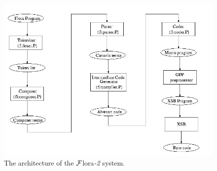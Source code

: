 \documentclass[11pt]{article}
\newcommand{\FLORA}{{\mbox{\sc ${\cal F}${lora}\rm\emph{-2}}}\xspace}
\begin{document}
\begin{figure}[bt]
  \begin{center}
    \includegraphics[width=5.5in]{architecture}
  \end{center}
  \caption{The architecture of the \FLORA system.}
  \label{fig-arch}
\end{figure}
\end{document}
